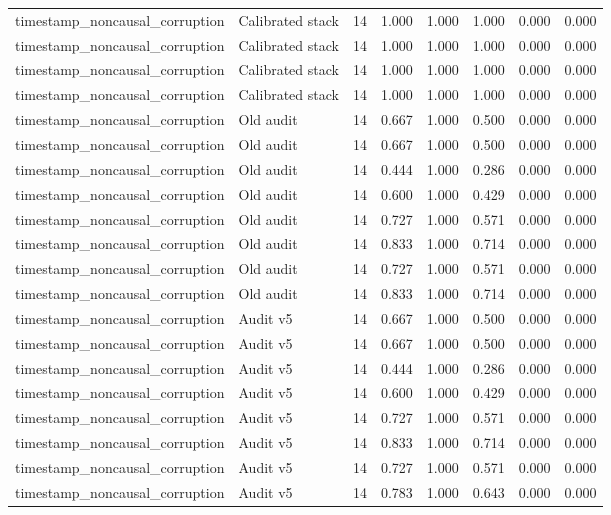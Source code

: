 {\begin{longtable}{llrrrrrr}
timestamp\_noncausal\_corruption & Calibrated stack & 14 & 1.000 & 1.000 & 1.000 & 0.000 & 0.000 \\
timestamp\_noncausal\_corruption & Calibrated stack & 14 & 1.000 & 1.000 & 1.000 & 0.000 & 0.000 \\
timestamp\_noncausal\_corruption & Calibrated stack & 14 & 1.000 & 1.000 & 1.000 & 0.000 & 0.000 \\
timestamp\_noncausal\_corruption & Calibrated stack & 14 & 1.000 & 1.000 & 1.000 & 0.000 & 0.000 \\
timestamp\_noncausal\_corruption & Old audit & 14 & 0.667 & 1.000 & 0.500 & 0.000 & 0.000 \\
timestamp\_noncausal\_corruption & Old audit & 14 & 0.667 & 1.000 & 0.500 & 0.000 & 0.000 \\
timestamp\_noncausal\_corruption & Old audit & 14 & 0.444 & 1.000 & 0.286 & 0.000 & 0.000 \\
timestamp\_noncausal\_corruption & Old audit & 14 & 0.600 & 1.000 & 0.429 & 0.000 & 0.000 \\
timestamp\_noncausal\_corruption & Old audit & 14 & 0.727 & 1.000 & 0.571 & 0.000 & 0.000 \\
timestamp\_noncausal\_corruption & Old audit & 14 & 0.833 & 1.000 & 0.714 & 0.000 & 0.000 \\
timestamp\_noncausal\_corruption & Old audit & 14 & 0.727 & 1.000 & 0.571 & 0.000 & 0.000 \\
timestamp\_noncausal\_corruption & Old audit & 14 & 0.833 & 1.000 & 0.714 & 0.000 & 0.000 \\
timestamp\_noncausal\_corruption & Audit v5 & 14 & 0.667 & 1.000 & 0.500 & 0.000 & 0.000 \\
timestamp\_noncausal\_corruption & Audit v5 & 14 & 0.667 & 1.000 & 0.500 & 0.000 & 0.000 \\
timestamp\_noncausal\_corruption & Audit v5 & 14 & 0.444 & 1.000 & 0.286 & 0.000 & 0.000 \\
timestamp\_noncausal\_corruption & Audit v5 & 14 & 0.600 & 1.000 & 0.429 & 0.000 & 0.000 \\
timestamp\_noncausal\_corruption & Audit v5 & 14 & 0.727 & 1.000 & 0.571 & 0.000 & 0.000 \\
timestamp\_noncausal\_corruption & Audit v5 & 14 & 0.833 & 1.000 & 0.714 & 0.000 & 0.000 \\
timestamp\_noncausal\_corruption & Audit v5 & 14 & 0.727 & 1.000 & 0.571 & 0.000 & 0.000 \\
timestamp\_noncausal\_corruption & Audit v5 & 14 & 0.783 & 1.000 & 0.643 & 0.000 & 0.000 \\

\end{longtable}}
